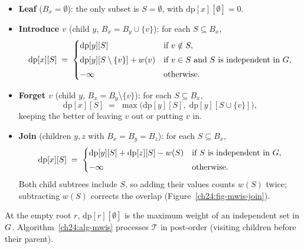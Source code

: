 \begin{itemize}
  \item \textbf{Leaf} ($B_x=\emptyset$): the only subset is $S=\emptyset$, with
        $\mathrm{dp}[x][\emptyset]=0$.
  \item \textbf{Introduce $v$} (child $y$, $B_x=B_y\cup\{v\}$): for each $S\subseteq B_x$,
        \[
          \mathrm{dp}[x][S] \;=\;
          \begin{cases}
            \mathrm{dp}[y][S] & \text{if } v\notin S,\\[3pt]
            \mathrm{dp}[y][S\setminus\{v\}] + w(v) & \text{if } v\in S \text{ and } S \text{ is independent in }G,\\[3pt]
            -\infty & \text{otherwise}.
          \end{cases}
        \]
  \item \textbf{Forget $v$} (child $y$, $B_x=B_y\setminus\{v\}$): for each $S\subseteq B_x$,
        \[
          \mathrm{dp}[x][S] \;=\; \max\bigl(\mathrm{dp}[y][S],\;
          \mathrm{dp}[y][S\cup\{v\}]\bigr),
        \]
        keeping the better of leaving $v$ out or putting $v$ in.
  \item \textbf{Join} (children $y,z$ with $B_x=B_y=B_z$): for each $S\subseteq B_x$,
        \[
          \mathrm{dp}[x][S] \;=\;
          \begin{cases}
            \mathrm{dp}[y][S]+\mathrm{dp}[z][S]-w(S) & \text{if } S \text{ is independent in }G,\\[3pt]
            -\infty & \text{otherwise}.
          \end{cases}
        \]
        Both child subtrees include $S$, so adding their values counts $w(S)$
        twice; subtracting $w(S)$ corrects the overlap (Figure~\ref{ch24:fig-mwis-join}).
\end{itemize}

At the empty root $r$, $\mathrm{dp}[r][\emptyset]$ is the maximum weight of an
independent set in $G$. Algorithm~\ref{ch24:alg-mwis} processes $\mathcal{T}$ in
post-order (visiting children before their parent).

